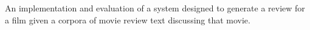 An implementation and evaluation of a system designed to generate a review for a film given a corpora of movie review text discussing that movie.